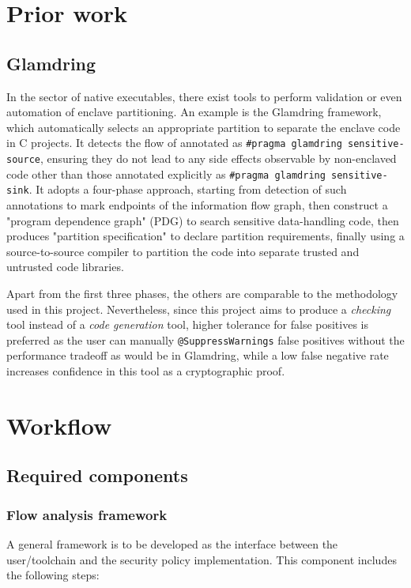 \documentclass[a4paper, 10pt]{article}
\begin{document}
\section{Prior work}
\subsection{Glamdring}
In the sector of native executables,
there exist tools to perform validation or even automation of enclave partitioning.
An example is the Glamdring \cite{glamdring} framework,
which automatically selects an appropriate partition to separate the enclave code in C projects.
It detects the flow of annotated as \texttt{\#pragma glamdring sensitive-source},
ensuring they do not lead to any side effects observable by non-enclaved code
other than those annotated explicitly as \texttt{\#pragma glamdring sensitive-sink}.
It adopts a four-phase approach,
starting from detection of such annotations to mark endpoints of the information flow graph,
then construct a "program dependence graph" (PDG) to search sensitive data-handling code,
then produces "partition specification" to declare partition requirements,
finally using a source-to-source compiler to partition the code into separate
trusted and untrusted code libraries.

Apart from the first three phases,
the others are comparable to the methodology used in this project.
Nevertheless, since this project aims to produce
a \emph{checking} tool instead of a \emph{code generation} tool,
higher tolerance for false positives is preferred
as the user can manually \texttt{@SuppressWarnings} false positives
without the performance tradeoff as would be in Glamdring,
while a low false negative rate increases confidence
in this tool as a cryptographic proof.

\section{Workflow}
\subsection{Required components}
\subsubsection{Flow analysis framework}
A general framework is to be developed as the interface
between the user/toolchain and the security policy implementation.
This component includes the following steps:
\end{document}

